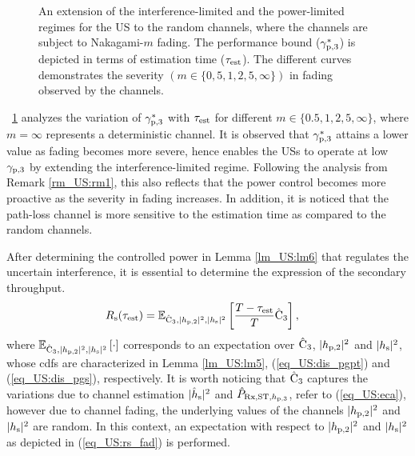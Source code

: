 \begin{figure}[!ht]
\caption{An extension of the interference-limited and the power-limited regimes for the US to the random channels, where the channels are subject to Nakagami-$m$ fading. The performance bound (${\gamma}_{\text{p,3}}^*$) is depicted in terms of estimation time ($\tau_{\text{est}}$). The different curves demonstrates the severity $(m \in \{0,5,1,2,5, \infty \})$ in fading observed by the channels.}
\label{fig_US:or_fad}
\end{figure}
\begin{remark} \label{rm_US:rm2}
\normalfont
\figurename~\ref{fig_US:or_fad} analyzes the variation of ${\gamma}_{\text{p,3}}^*$ with $\tau_{\text{est}}$ for different $m \in \{0.5, 1, 2, 5, \infty\}$, where $m = \infty$ represents a deterministic channel. It is observed that ${\gamma}_{\text{p,3}}^*$ attains a lower value as fading becomes more severe, hence enables the USs to operate at low ${\gamma}_{\text{p,3}}$ by extending the interference-limited regime. Following the analysis from Remark \ref{rm_US:rm1}, this also reflects that the power control becomes more proactive as the severity in fading increases. In addition, it is noticed that the path-loss channel is more sensitive to the estimation time as compared to the random channels.  
\end{remark}
After determining the controlled power in Lemma \ref{lm_US:lm6} that regulates the uncertain interference, it is essential to determine the expression of the secondary throughput.
\begin{align}
R_{\text{s}}(\tau_{\text{est}}) &= {\mathbb E}_{\hat{\text{{C}}}_{\text{3}}, |h_{\text{p,2}}|^2, |h_{\text{s}}|^2}\left[ \frac{T - \tau_{\text{est}}}{T} \hat{\text{{C}}}_{\text{3}}  \right], \label{eq_US:rs_fad} 
\end{align} 
where ${\mathbb E}_{\hat{\text{{C}}}_{\text{3}}, |h_{\text{p,2}}|^2, |h_{\text{s}}|^2}\left[ \cdot \right]$ corresponds to an expectation over $\hat{\text{{C}}}_{\text{3}}$, $|h_{\text{p,2}}|^2$ and $|h_{\text{s}}|^2$, whose cdfs are characterized in Lemma \ref{lm_US:lm5}, (\ref{eq_US:dis_pgpt}) and (\ref{eq_US:dis_pgs}), respectively. It is worth noticing that $\hat{\text{{C}}}_{\text{3}}$ captures the variations due to channel estimation $|\hat{h}_{\text{s}}|^2$ and $\hat{P}_{\text{Rx,ST,$h_{\text{p,3}}$}}$, refer to (\ref{eq_US:eca}), however due to channel fading, the underlying values of the channels $|h_{\text{p,2}}|^2$ and $|h_{\text{s}}|^2$ are random. In this context, an expectation with respect to $|h_{\text{p,2}}|^2$ and $|h_{\text{s}}|^2$ as depicted in (\ref{eq_US:rs_fad}) is performed.
